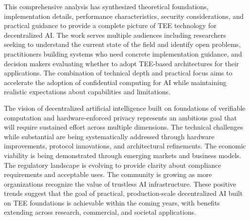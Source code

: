 This comprehensive analysis has synthesized theoretical foundations, implementation details, performance characteristics, security considerations, and practical guidance to provide a complete picture of TEE technology for decentralized AI. The work serves multiple audiences including researchers seeking to understand the current state of the field and identify open problems, practitioners building systems who need concrete implementation guidance, and decision makers evaluating whether to adopt TEE-based architectures for their applications. The combination of technical depth and practical focus aims to accelerate the adoption of confidential computing for AI while maintaining realistic expectations about capabilities and limitations.

The vision of decentralized artificial intelligence built on foundations of verifiable computation and hardware-enforced privacy represents an ambitious goal that will require sustained effort across multiple dimensions. The technical challenges while substantial are being systematically addressed through hardware improvements, protocol innovations, and architectural refinements. The economic viability is being demonstrated through emerging markets and business models. The regulatory landscape is evolving to provide clarity about compliance requirements and acceptable uses. The community is growing as more organizations recognize the value of trustless AI infrastructure. These positive trends suggest that the goal of practical, production-scale decentralized AI built on TEE foundations is achievable within the coming years, with benefits extending across research, commercial, and societal applications.